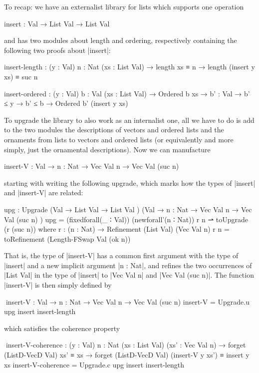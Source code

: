 To recap: we have an externalist library for lists which supports one operation
\begin{code}
insert : Val → List Val → List Val
\end{code}
and has two modules about length and ordering, respectively containing the following two proofs about |insert|:
\begin{code}
insert-length   :  (y : Val) {n : Nat} (xs : List Val) →
                   length xs ≡ n → length (insert y xs) ≡ suc n
                 
insert-ordered  :  (y : Val) {b : Val} (xs : List Val) → Ordered b xs →
                   {b' : Val} → b' ≤ y → b' ≤ b → Ordered b' (insert y xs)
\end{code}
To upgrade the library to also work as an internalist one, all we have to do is add to the two modules the descriptions of vectors and ordered lists and the ornaments from lists to vectors and ordered lists (or equivalently and more simply, just the ornamental descriptions).
Now we can manufacture
\begin{code}
insert-V :  Val → {n : Nat} → Vec Val n → Vec Val (suc n)
\end{code}
starting with writing the following upgrade, which marks how the types of |insert| and |insert-V| are related:
\begin{code}
upg : Upgrade  (Val →              List  Val    → List  Val          )
               (Val → {n : Nat} →  Vec   Val n  → Vec   Val (suc n)  )
upg = (fixedforall(_ ∶ Val)) (newforall'(n ∶ Nat)) r n ⇀ toUpgrade (r (suc n))
  where  r : (n : Nat) → Refinement (List Val) (Vec Val n)
         r n = toRefinement (Length-FSwap Val (ok n))
\end{code}
That is, the type of |insert-V| has a common first argument with the type of |insert| and a new implicit argument |n : Nat|, and refines the two occurrences of |List Val| in the type of |insert| to |Vec Val n| and |Vec Val (suc n)|.
The function |insert-V| is then simply defined by
\begin{code}
^^^insert-V :  Val → {n : Nat} → Vec Val n → Vec Val (suc n)
insert-V = Upgrade.u upg insert insert-length
\end{code}
which satisfies the coherence property
\begin{code}
^^^insert-V-coherence :
  (y : Val) {n : Nat} (xs : List Val) (xs' : Vec Val n) →
  forget (ListD-VecD Val) xs' ≡ xs →
  forget (ListD-VecD Val) (insert-V y xs') ≡ insert y xs
insert-V-coherence = Upgrade.c upg insert insert-length
\end{code}
